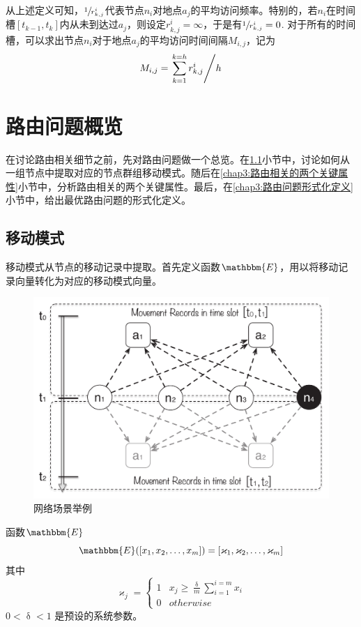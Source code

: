 从上述定义可知，$\sfrac{1}{r^i_{k,j}}$代表节点$n_i$对地点$a_j$的平均访问频率。特别的，若$n_i$在时间槽$[t_{k-1},t_k]$内从未到达过$a_j$，则设定$r_{k,j}^i=\infty$，于是有$\sfrac{1}{r^i_{k,j}}=0$. 对于所有的时间槽，可以求出节点$n_i$对于地点$a_j$的平均访问时间间隔$M_{i,j}$，记为
\begin{equation}
M_{i,j}=\left.\sum_{k=1}^{k=h}r^{i}_{k,j}\middle/h\right.
\label{eq:meeting_interval}
\end{equation}

\section{路由问题概览}
\label{chap3:路由问题概览}

在讨论路由相关细节之前，先对路由问题做一个总览。在\ref{chap3:移动模式}小节中，讨论如何从一组节点中提取对应的节点群组移动模式。随后在\ref{chap3:路由相关的两个关键属性}小节中，分析路由相关的两个关键属性。最后，在\ref{chap3:路由问题形式化定义}小节中，给出最优路由问题的形式化定义。

\subsection{移动模式}
\label{chap3:移动模式}

移动模式从节点的移动记录中提取。首先定义函数$\mathbbm{E}$，用以将移动记录向量转化为对应的移动模式向量。

\begin{figure}[hbt]
\centering
  \includegraphics[width=0.5\linewidth]{paper-MPAR/example1}
  \caption{网络场景举例}
  \label{fig:chap3_example1}
\end{figure}

\begin{definition} 函数$\mathbbm{E}$
\[\mathbbm{E}([x_1,x_2,\ldots,x_m])=[\varkappa _1,\varkappa _2,\ldots,\varkappa _m]\]\textnormal{其中}
\begin{equation}
\varkappa _j=\left\{
\begin{array}{cl}
 1 &x_j\geq\frac{\updelta}{m}\sum_{i=1}^{i=m}x_i\\
 0 & otherwise
\end{array}
\right.
\label{eq:extract}
\end{equation}
\textnormal{$0<\updelta<1$ 是预设的系统参数。}
\label{def:函数E}
\end{definition}

